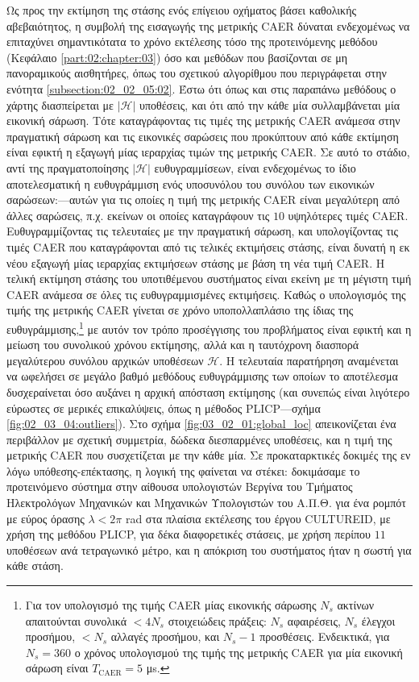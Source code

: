 Ως προς την εκτίμηση της στάσης ενός επίγειου οχήματος βάσει καθολικής
αβεβαιότητος, η συμβολή της εισαγωγής της μετρικής CAER δύναται ενδεχομένως να
επιταχύνει σημαντικότατα το χρόνο εκτέλεσης τόσο της προτεινόμενης μεθόδου
(Κεφάλαιο \ref{part:02:chapter:03}) όσο και μεθόδων που βασίζονται σε μη
πανοραμικούς αισθητήρες, όπως του σχετικού αλγορίθμου που περιγράφεται στην
ενότητα \ref{subsection:02_02_05:02}. Έστω ότι όπως και στις παραπάνω μεθόδους
ο χάρτης διασπείρεται με $|\mathcal{H}|$ υποθέσεις, και ότι από την κάθε μία
συλλαμβάνεται μία εικονική σάρωση. Τότε καταγράφοντας τις τιμές της μετρικής
CAER ανάμεσα στην πραγματική σάρωση και τις εικονικές σαρώσεις που προκύπτουν
από κάθε εκτίμηση είναι εφικτή η εξαγωγή μίας ιεραρχίας τιμών της μετρικής
CAER. Σε αυτό το στάδιο, αντί της πραγματοποίησης $|\mathcal{H}|$
ευθυγραμμίσεων, είναι ενδεχομένως το ίδιο αποτελεσματική η ευθυγράμμιση ενός
υποσυνόλου του συνόλου των εικονικών σαρώσεων:---αυτών για τις οποίες η τιμή
της μετρικής CAER είναι μεγαλύτερη από άλλες σαρώσεις, π.χ. εκείνων οι οποίες
καταγράφουν τις $10$ υψηλότερες τιμές CAER.  Ευθυγραμμίζοντας τις τελευταίες με
την πραγματική σάρωση, και υπολογίζοντας τις τιμές CAER που καταγράφονται από
τις τελικές εκτιμήσεις στάσης, είναι δυνατή η εκ νέου εξαγωγή μίας ιεραρχίας
εκτιμήσεων στάσης με βάση τη νέα τιμή CAER. Η τελική εκτίμηση στάσης του
υποτιθέμενου συστήματος είναι εκείνη με τη μέγιστη τιμή CAER ανάμεσα σε όλες
τις ευθυγραμμισμένες εκτιμήσεις. Καθώς ο υπολογισμός της τιμής της μετρικής
CAER γίνεται σε χρόνο υποπολλαπλάσιο της ίδιας της ευθυγράμμισης,\footnote{Για
τον υπολογισμό της τιμής CAER μίας εικονικής σάρωσης $N_s$ ακτίνων απαιτούνται
συνολικά $<4N_s$ στοιχειώδεις πράξεις: $N_s$ αφαιρέσεις, $N_s$ έλεγχοι
προσήμου, $< N_s$ αλλαγές προσήμου, και $N_s-1$ προσθέσεις. Ενδεικτικά, για
$N_s=360$ ο χρόνος υπολογισμού της τιμής της μετρικής CAER για μία εικονική
σάρωση είναι $T_{\text{CAER}} = 5$ μs.} με αυτόν τον τρόπο προσέγγισης του
προβλήματος είναι εφικτή και η μείωση του συνολικού χρόνου εκτίμησης, αλλά και
η ταυτόχρονη διασπορά μεγαλύτερου συνόλου αρχικών υποθέσεων $\mathcal{H}$. Η
τελευταία παρατήρηση αναμένεται να ωφελήσει σε μεγάλο βαθμό μεθόδους
ευθυγράμμισης των οποίων το αποτέλεσμα δυσχεραίνεται όσο αυξάνει η αρχική
απόσταση εκτίμησης (και συνεπώς είναι λιγότερο εύρωστες σε μερικές επικαλύψεις,
όπως η μέθοδος PLICP---σχήμα \ref{fig:02_03_04:outliers}).  Στο σχήμα
\ref{fig:03_02_01:global_loc} απεικονίζεται ένα περιβάλλον με σχετική
συμμετρία, δώδεκα διεσπαρμένες υποθέσεις, και η τιμή της μετρικής CAER που
συσχετίζεται με την κάθε μία. Σε προκαταρκτικές δοκιμές της εν λόγω
υπόθεσης-επέκτασης, η λογική της φαίνεται να στέκει: δοκιμάσαμε το προτεινόμενο
σύστημα στην αίθουσα υπολογιστών Βεργίνα του Τμήματος Ηλεκτρολόγων Μηχανικών
και Μηχανικών Υπολογιστών του Α.Π.Θ. για ένα ρομπότ με εύρος όρασης
$\lambda < 2\pi$ rad στα πλαίσια εκτέλεσης του έργου CULTUREID, με χρήση της
μεθόδου PLICP, για δέκα διαφορετικές στάσεις, με χρήση περίπου $11$ υποθέσεων
ανά τετραγωνικό μέτρο, και η απόκριση του συστήματος ήταν η σωστή για κάθε
στάση.

